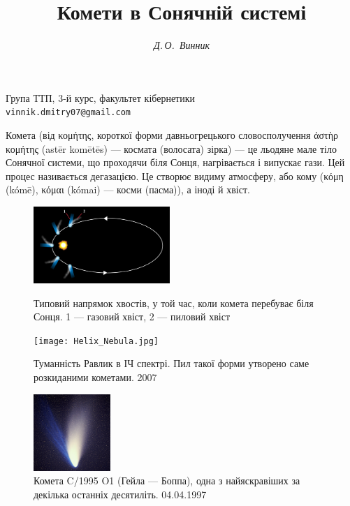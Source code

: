 \documentclass[a4paper]{article}
\begin{document}
    
    \title{Комети в Сонячній системі}
    \author{\textsl{Д.\,О.~Винник}}
    \date{\vspace*{-6ex}}
    \maketitle
    \begin{center} 
        {\small Група ТТП, 3-й курс, факультет кібернетики\\
        {\tt vinnik.dmitry07@gmail.com}}
    \end{center}
    
    Комета (від κομήτης, короткої форми давньогрецького словосполучення ἀστὴρ κομήτης (astēr komētēs) --- космата (волосата) зірка)\cite{5} --- це льодяне мале тіло Сонячної системи, що проходячи біля Сонця, нагрівається і випускає гази. Цей процес називається дегазацією. Це створює видиму атмосферу, або кому (κόμη (kómē), κόμαι (kómai) --- косми (пасма)), а іноді й хвіст. 
    
    \begin{figure}[ht]
        \centering
        \vspace*{-2ex}
        \begin{minipage}[t]{0.4\textwidth}
            \includegraphics[height=110px]{schema.png}
            \vspace*{-5ex}
            \caption{Типовий напрямок хвостів, у той час, коли комета перебуває біля Сонця. 1 --- газовий хвіст, 2 --- пиловий хвіст\cite{6}}
        \end{minipage}
        \hfill
        \begin{minipage}[t]{0.27\textwidth}
            \texttt{[image: Helix\_Nebula.jpg]}
            \vspace*{-5ex}
            \caption{Туманність Равлик в ІЧ спектрі. Пил такої форми утворено саме розкиданими кометами. 2007\cite{7}}
        \end{minipage}
        \hfill
        \begin{minipage}[t]{0.29\textwidth}
            \includegraphics[height=110px]{Hale-Bopp.jpg}
            \vspace*{-2ex}
            \caption{Комета C/1995 O1 (Гейла --- Боппа), одна з найяскравіших за декілька останніх десятиліть. 04.04.1997\cite{8}}
        \end{minipage}
        \vspace*{-2ex}
    \end{figure}
    
\end{document}

